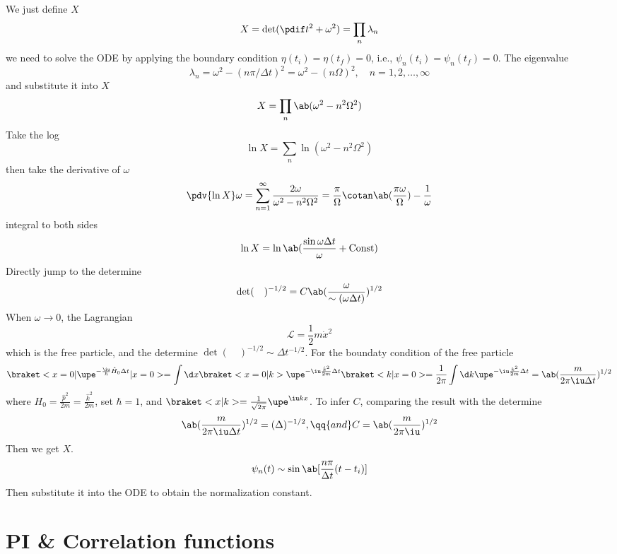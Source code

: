 \begin{enumext}
\[  \]
  We just define $X$
  \[
    X = \det(\pdif t^2 + \omega^2)
  = \prod_n \lambda_n 
  \]
  we need to solve the ODE by applying the boundary condition $\eta(t_i) = \eta(t_f) = 0$, i.e., $\psi_n(t_i) = \psi_n(t_f) = 0$.
  The eigenvalue
  \[
    \lambda_n = \omega^2 - (n\pi/\Delta t)^2
  = \omega^2- (n\Omega)^2, \quad n = 1, 2, \ldots, \infty
  \]
  and substitute it into $X$
  \[
    X = \prod_n \ab(\omega^2 - n^2\Omega^2)
  \]
  Take the log
  \[
    \ln X = \sum_n \ln(\omega^2 - n^2 \Omega^2)
  \]
  then take the derivative of $\omega$
  \[
    \pdv{\ln X}\omega = \sum_{n=1}^\infty \frac{2\omega}{\omega^2 - n^2\Omega^2}
  = \frac\pi\Omega \cotan \ab(\frac{\pi\omega}{\Omega}) - \frac1\omega
  \]
  integral to both sides
  \[
    \ln X = \ln\ab(\frac{\sin \omega\Delta t}{\omega} + \text{Const})
  \]
  Directly jump to the determine
  \[
    \det(\quad)^{-1/2} = C\ab(\frac{\omega}{\sim(\omega\Delta t)})^{1/2}
  \]
  When $\omega \to 0$, the Lagrangian
  \[
    \mathcal L = \frac12 m\dot x^2
  \]
  which is the free particle, and the determine $\det(\quad)^{-1/2} \sim \Delta t^{-1/2}$.
  For the boundaty condition of the free particle
  \[
    \braket<x=0|\upe^{-\frac\iu\hbar\hat H_0\Delta t}|x=0>
  = \int \d x \braket<x = 0|k> \upe^{-\iu\frac{\hat k^2}{2m} \Delta t}
    \braket<k|x = 0>
  = \frac1{2\pi} \int \d k \upe^{-\iu\frac{k^2}{2m}\Delta t}
  = \ab(\frac{m}{2\pi\iu\Delta t})^{1/2}
  \]
  where $H_0 = \frac{\hat p^2}{2m} = \frac{\hat k^2}{2m}$, set $\hbar = 1$,
  and $\braket<x|k> = \frac1{\sqrt{2\pi}} \upe^{\iu kx}$.
  To infer $C$, comparing the result with the determine
  \[
    \ab(\frac{m}{2\pi\iu\Delta t})^{1/2} = (\Delta)^{-1/2}, \qq{and}
    C = \ab(\frac m{2\pi\iu})^{1/2}
  \]
  Then we get $X$.
  \[
    \psi_n(t) \sim \sin \ab[\frac{n\pi}{\Delta t}(t - t_i)]
  \]
  Then substitute it into the ODE to obtain the normalization constant.
\end{enumext}

\section{PI \& Correlation functions}

